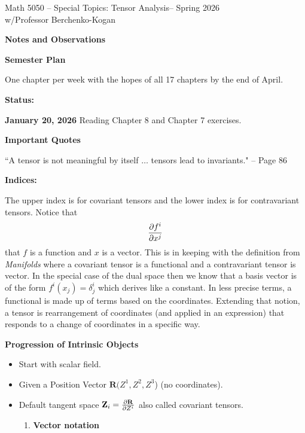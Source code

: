 \documentclass[12pt,a4paper]{report}
\newcommand{\CLASSNAME}{Math 5050 -- Special Topics: Tensor Analysis}
\newcommand{\PROFESSOR}{Professor Berchenko-Kogan}
\newcommand{\SEMESTER}{Spring 2026}
\newcommand{\VK}[1]{\textbf{#1}}
\begin{document}
\begin{center}
	\Large{\CLASSNAME -- \SEMESTER} \\
	\large{ w/\PROFESSOR}
\end{center}

\begin{center}
\textbf{\Large{Notes and Observations}}
\end{center}

\HLINE

\begin{description}

	\item \textbf{Semester Plan}

		One chapter per week with the hopes of all 17 chapters by the end of April.	
	
	\item \textbf{Status:}
	\begin{description}
		\item \textbf{January 20, 2026}  Reading Chapter 8 and Chapter 7 exercises.
	\end{description}

	\item \textbf{Important Quotes}
	
	``A tensor is not meaningful by itself $\dots$ tensors lead to invariants." -- Page 86
	
	\item \textbf{Indices:}
	
	The upper index is for covariant tensors and the lower index is for contravariant tensors.  Notice that 
	\begin{align*}
		\frac{\partial f^i}{\partial x^j}
	\end{align*}that $f$ is a function and $x$ is a vector.  This is in keeping with the definition from \textit{Manifolds} where a covariant tensor is a functional and a contravariant tensor is vector.  In the special case of the dual space then we know that a basis vector is of the form $f^i(x_j)=\delta^i_j$ which derives like a constant.  In less precise terms, a functional is made up of terms based on the coordinates.  Extending that notion, a tensor is rearrangement of coordinates (and applied in an expression) that responds to a change of coordinates in a specific way.
	
	\item \textbf{Progression of Intrinsic Objects}
	\begin{itemize}
		\item Start with scalar field.
		\item Given a Position Vector $\VK{R}(Z^1, Z^2, Z^3$) (no coordinates).
		\item Default tangent space $\VK{Z}_i = \PART{\VK{R}}{Z^i}$ also called  covariant tensors.
		\begin{enumerate}
			\item \textbf{Vector notation}
			

\end{enumerate}
\end{itemize}
\end{description}
\end{document}
